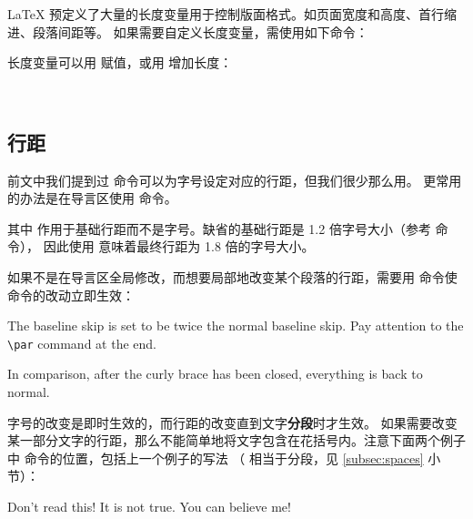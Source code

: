 \LaTeX{} 预定义了大量的长度变量用于控制版面格式。如页面宽度和高度、首行缩进、段落间距等。
如果需要自定义长度变量，需使用如下命令：
\begin{command}
\end{command}

长度变量可以用  赋值，或用  增加长度：
\begin{command}
 \\
\end{command}

\subsection{行距}\label{subsec:linespread}

前文中我们提到过  命令可以为字号设定对应的行距，但我们很少那么用。
更常用的办法是在导言区使用  命令。
\begin{command}
\end{command}

其中  作用于基础行距而不是字号。缺省的基础行距是 1.2 倍字号大小（参考  命令），
因此使用  意味着最终行距为 1.8 倍的字号大小。

如果不是在导言区全局修改，而想要局部地改变某个段落的行距，需要用  命令使  命令的改动立即生效：
\begin{example}
{\linespread{2.0}\selectfont
The baseline skip is set to be
twice the normal baseline skip.
Pay attention to the \verb|\par|
command at the end. \par}

In comparison, after the
curly brace has been closed,
everything is back to normal.
\end{example}

字号的改变是即时生效的，而行距的改变直到文字\textbf{分段}时才生效。
如果需要改变某一部分文字的行距，那么不能简单地将文字包含在花括号内。注意下面两个例子中  命令的位置，包括上一个例子的写法
（ 相当于分段，见 \ref{subsec:spaces} 小节）：
\begin{example}
{\Large Don't read this!
 It is not true.
 You can believe me!\par}
\end{example}

